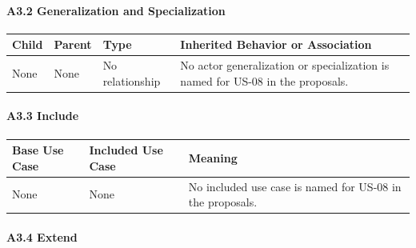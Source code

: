 \documentclass[12pt]{article}
\renewcommand{\baselinestretch}{1.5}
\begin{document}
\hypertarget{sec:a3-2-generalization-and-specialization}{}
\paragraph*{A3.2 Generalization and Specialization}
\par\medskip

\begingroup
\small
\renewcommand{\baselinestretch}{1.0}\selectfont
\renewcommand{\arraystretch}{1.15}
\setlength{\tabcolsep}{6pt}
\begin{longtable}{|>{\raggedright\arraybackslash}p{}|>{\raggedright\arraybackslash}p{}|>{\raggedright\arraybackslash}p{}|>{\raggedright\arraybackslash}p{}|}
\hline
\textbf{Child} & \textbf{Parent} & \textbf{Type} & \textbf{Inherited Behavior or Association} \\ \hline
\endhead
None & None & No relationship & No actor generalization or specialization is named for US-08 in the proposals. \\ \hline
\end{longtable}
\endgroup
\par\medskip

\hypertarget{sec:a3-3-include}{}
\paragraph*{A3.3 Include}
\par\medskip

\begingroup
\small
\renewcommand{\baselinestretch}{1.0}\selectfont
\renewcommand{\arraystretch}{1.15}
\setlength{\tabcolsep}{6pt}
\begin{longtable}{|>{\raggedright\arraybackslash}p{}|>{\raggedright\arraybackslash}p{}|>{\raggedright\arraybackslash}p{}|}
\hline
\textbf{Base Use Case} & \textbf{Included Use Case} & \textbf{Meaning} \\ \hline
\endhead
None & None & No included use case is named for US-08 in the proposals. \\ \hline
\end{longtable}
\endgroup
\par\medskip

\hypertarget{sec:a3-4-extend}{}
\paragraph*{A3.4 Extend}
\par\medskip
\end{document}
